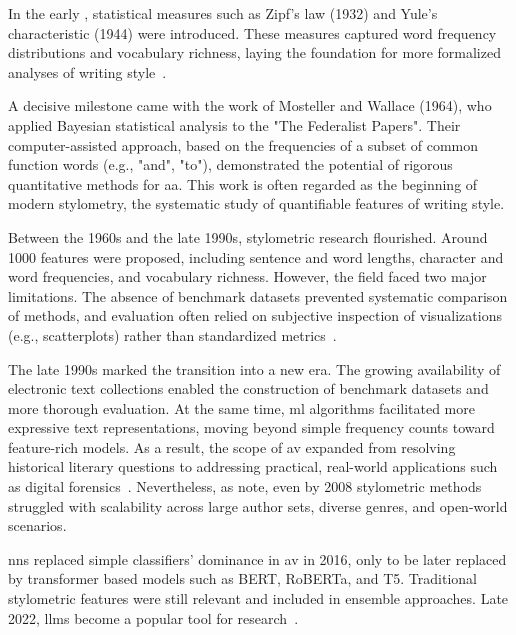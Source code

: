 
In the early , statistical measures such as Zipf's law (1932) and Yule's characteristic (1944) were introduced. 
These measures captured word frequency distributions and vocabulary richness, laying the foundation for more formalized analyses of writing style~\citep{neal_surveying_2018,stamatatos_survey_2009}.

A decisive milestone came with the work of Mosteller and Wallace (1964), who applied Bayesian statistical analysis to the "The Federalist Papers".
Their computer-assisted approach, based on the frequencies of a subset of common function words (e.g., "and", "to"), demonstrated the potential of rigorous quantitative methods for \ac{aa}. 
This work is often regarded as the beginning of modern stylometry, the systematic study of quantifiable features of writing style.

Between the 1960s and the late 1990s, stylometric research flourished.
Around \num{1000} features were proposed, including sentence and word lengths, character and word frequencies, and vocabulary richness. 
However, the field faced two major limitations. 
The absence of benchmark datasets prevented systematic comparison of methods, and evaluation often relied on subjective inspection of visualizations (e.g., scatterplots) rather than standardized metrics~\citep{stamatatos_survey_2009}.

The late 1990s marked the transition into a new era. 
The growing availability of electronic text collections enabled the construction of benchmark datasets and more thorough evaluation. 
At the same time, \ac{ml} algorithms facilitated more expressive text representations, moving beyond simple frequency counts toward feature-rich models. 
As a result, the scope of \ac{av} expanded from resolving historical literary questions to addressing practical, real-world applications such as digital forensics~\citep{stamatatos_survey_2009}. 
Nevertheless, as \citet{abbasi_writeprints_2008} note, even by 2008 stylometric methods struggled with scalability across large author sets, diverse genres, and open-world scenarios.

\acp{nn} replaced simple classifiers' dominance in \ac{av} in 2016, only to be later replaced by transformer based models such as BERT, RoBERTa, and T5.
Traditional stylometric features were still relevant and included in ensemble approaches.
Late 2022, \acp{llm} become a popular tool for research~\citep{schmidt_llm_av_latin_24}. 